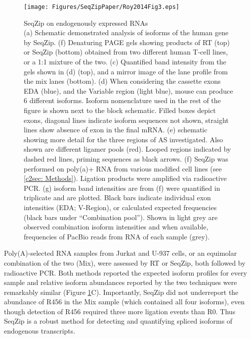 {		\begin{figure}[htbp] %
			\centering 
			\texttt{[image: Figures/SeqZipPaper/Roy2014Fig3.eps]}
			\caption[SeqZip on endogenously expressed RNAs]
			{
				SeqZip on endogenously expressed RNAs\\
				(a) Schematic demonstrated analysis of isoforms of the human \cd{} gene by SeqZip.
				(f) Denaturing PAGE gels showing products of RT (top) or SeqZip (bottom) \cd{} obtained from two different human T-cell lines, or a 1:1 mixture of the two.
				(c) Quantified band intensity from the gels shown in (d) (top), and a mirror image of the lane profile from the mix lanes (bottom).
				(d) When considering the cassette exons EDA (blue), and the Variable region (light blue), mouse \fn{} can produce 6 different isoforms. Isoform nomenclature used in the rest of the figure is shown next to the block schematic. Filled boxes depict exons, diagonal lines indicate isoform sequences not shown, straight lines show absence of exon in the final mRNA.
				(e) schematic showing more detail for the three regions of \fn{} AS investigated. Also shown are different ligamer pools (red). Looped regions indicated by dashed red lines, priming sequences as black arrows. 
				 (f) SeqZip was performed on poly(a)+ RNA from various \fn{} modified cell lines (see \ref{c2sec: Methods}). Ligation products were amplified via radioactive PCR. 
				(g) isoform band intensities are from (f) were quantified in triplicate and are plotted. Black bars indicate individual exon intensities (EDA; V-Region), or calculated expected frequencies (black bars under ``Combination pool''). Shown in light grey are observed combination isoform intensities and when available, frequencies of PacBio reads from RNA of each sample (grey). 
				}
			\label{fig:Roy2014 F3}
			\end{figure}

		Poly(A)-selected RNA samples from Jurkat and U-937 cells, or an equimolar combination of the two (Mix), were assessed by RT or SeqZip, both followed by radioactive PCR. Both methods reported the expected isoform profiles for every sample and relative isoform abundances reported by the two techniques were remarkably similar (Figure \ref{fig:Roy2014 F3}C). Importantly, SeqZip did not underreport the abundance of R456 in the Mix sample (which contained all four isoforms), even though detection of R456 required three more ligation events than R0. Thus SeqZip is a robust method for detecting and quantifying spliced isoforms of endogenous transcripts. 

}
